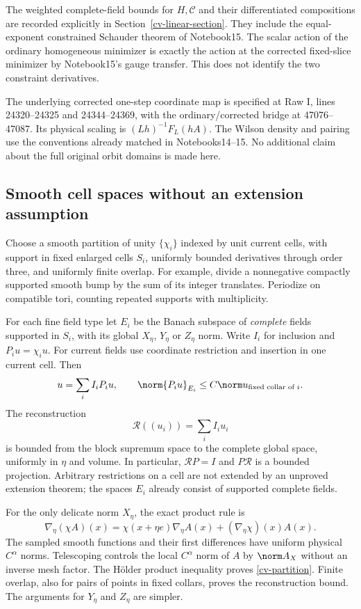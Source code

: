 The weighted complete-field bounds for $H,\mathcal C$ and
their differentiated compositions are recorded explicitly in
Section~\ref{cv-linear-section}. They include the
equal-exponent constrained Schauder theorem of Notebook15.
The scalar action of the ordinary homogeneous minimizer is
exactly the action at the corrected fixed-slice minimizer by
Notebook15's gauge transfer. This does not identify the two
constraint derivatives.

The underlying corrected one-step coordinate map is specified
at Raw I, lines 24320--24325 and 24344--24369, with the
ordinary/corrected bridge at 47076--47087. Its physical
scaling is $(Lh)^{-1}F_L(hA)$. The Wilson density and pairing
use the conventions already matched in Notebooks14--15.
No additional claim about the full original orbit domains is
made here.

\subsection{Smooth cell spaces without an extension assumption}
\label{cv-cells-section}

Choose a smooth partition of unity $\{\chi_i\}$ indexed by
unit current cells, with support in fixed enlarged cells
$S_i$, uniformly bounded derivatives through order three, and
uniformly finite overlap. For example, divide a nonnegative
compactly supported smooth bump by the sum of its integer
translates. Periodize on compatible tori, counting repeated
supports with multiplicity.

For each fine field type let $E_i$ be the Banach subspace of
\emph{complete} fields supported in $S_i$, with its global
$X_\eta$, $Y_\eta$ or $Z_\eta$ norm. Write $I_i$ for inclusion
and $P_iu=\chi_i u$. For current fields use coordinate
restriction and insertion in one current cell. Then
\begin{equation}\label{cv-partition}
 u=\sum_iI_iP_iu,\qquad
 \norm{P_iu}_{E_i}\le C\norm u_{\text{fixed collar of }i}.
\end{equation}
The reconstruction
\[
 \mathscr R((u_i))=\sum_iI_iu_i
\]
is bounded from the block supremum space to the complete
global space, uniformly in $\eta$ and volume. In particular,
$\mathscr RP=I$ and $P\mathscr R$ is a bounded projection.
Arbitrary restrictions on a cell are not extended by an
unproved extension theorem; the spaces $E_i$ already consist
of supported complete fields.

For the only delicate norm $X_\eta$, the exact product rule is
\begin{equation}\label{cv-product-rule}
 \nabla_\eta(\chi A)(x)
 =\chi(x+\eta e)\nabla_\eta A(x)
          +(\nabla_\eta\chi)(x)A(x).
\end{equation}
The sampled smooth functions and their first differences have
uniform physical $C^\alpha$ norms. Telescoping controls the
local $C^\alpha$ norm of $A$ by $\norm A_X$ without an inverse
mesh factor. The H\"older product inequality proves
\eqref{cv-partition}. Finite overlap, also for pairs of points
in fixed collars, proves the reconstruction bound. The
arguments for $Y_\eta$ and $Z_\eta$ are simpler.

